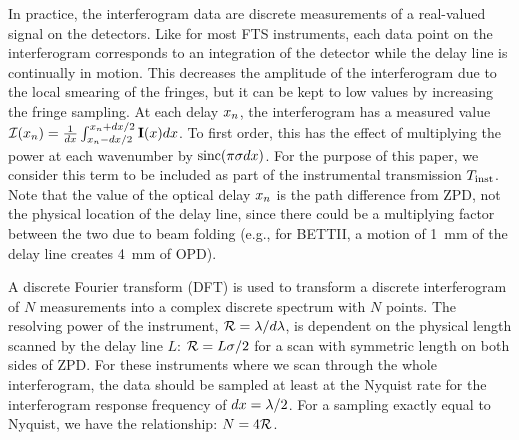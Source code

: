 In practice, the interferogram data are discrete measurements of a real-valued signal on the detectors. Like for most FTS instruments, each data point on the interferogram corresponds to an integration of the detector while the delay line is continually in motion. This decreases the amplitude of the interferogram due to the local smearing of the fringes, but it can be kept to low values by increasing the fringe sampling.
At each delay $x_n$, the interferogram has a measured value $\mathcal{I}(x_n) = \frac{1}{dx}\int_{x_n-dx/2}^{x_n+dx/2}\textrm{\textbf{I}}(x)dx$. To first order, this has the effect of multiplying the power at each wavenumber by $\textrm{sinc}(\pi\sigma dx)$. For the purpose of this paper, we consider this term to be included as part of the instrumental transmission $T_{\textrm{inst}}$. Note that the value of the optical delay $x_n$ is the path difference from ZPD, not the physical location of the delay line, since there could be a multiplying factor between the two due to beam folding (e.g., for BETTII, a motion of 1~mm of the delay line creates 4~mm of OPD).



A discrete Fourier transform (DFT) is used to transform a discrete interferogram of $N$ measurements into a complex discrete spectrum with $N$ points. The resolving power of the instrument, $\mathcal{R} = \lambda / d \lambda$, is dependent on the physical length scanned by the delay line $L$: $\mathcal{R} = L \sigma / 2 $ for a scan with symmetric length on both sides of ZPD. For these instruments where we scan through the whole interferogram, the data should be
sampled at least at the Nyquist rate for the interferogram response frequency of $dx = \lambda/2$. For a sampling exactly equal to Nyquist, we have the relationship: $N = 4 \mathcal{R}$.

